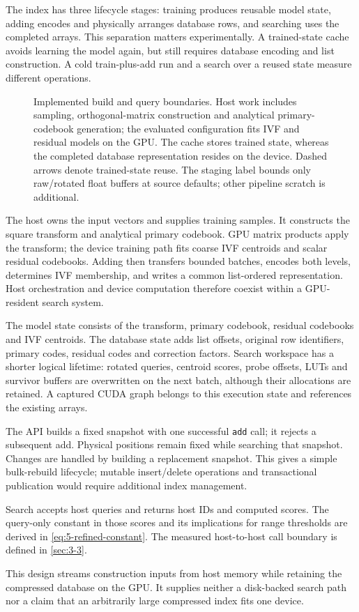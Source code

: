 The index has three lifecycle stages: training produces reusable model
state, adding encodes and physically arranges database rows, and searching
uses the completed arrays. This separation matters experimentally. A
trained-state cache avoids learning the model again, but still requires
database encoding and list construction. A cold train-plus-add run and a
search over a reused state measure different operations.

\begin{figure}[tbp]
\centering

\caption[Build and query architecture]{Implemented build and query boundaries. Host work includes
sampling, orthogonal-matrix construction and analytical primary-codebook
generation; the evaluated configuration fits IVF and residual models on
the GPU. The cache stores trained state, whereas the completed database
representation resides on the device. Dashed arrows denote trained-state
reuse. The staging label bounds only raw/rotated float buffers at source
defaults; other pipeline scratch is additional.}
\label{fig:4-architecture}
\end{figure}

The host owns the input vectors and supplies training samples. It constructs
the square transform and analytical primary codebook. GPU matrix products
apply the transform; the device training path fits coarse IVF centroids
and scalar residual codebooks. Adding then transfers bounded batches,
encodes both levels, determines IVF membership, and writes a common
list-ordered representation. Host orchestration and device computation
therefore coexist within a GPU-resident search system.

The model state consists of the transform, primary codebook, residual
codebooks and IVF centroids. The database state adds list offsets, original
row identifiers, primary codes, residual codes and correction factors.
Search workspace has a shorter logical lifetime: rotated queries, centroid
scores, probe offsets, LUTs and survivor buffers are overwritten on the
next batch, although their allocations are retained. A captured CUDA graph
belongs to this execution state and references the existing arrays.

The API builds a fixed snapshot with one successful \texttt{add}
call; it rejects a subsequent add. Physical positions remain fixed while
searching that snapshot. Changes are handled by building a replacement snapshot. This gives a
simple bulk-rebuild lifecycle; mutable insert/delete operations and
transactional publication would require additional index management.

Search accepts host queries and returns host IDs and computed scores.
The query-only constant in those scores and its implications for range
thresholds are derived in \cref{eq:5-refined-constant}. The measured
host-to-host call boundary is defined in \cref{sec:3-3}.


This design streams construction inputs from host memory while retaining
the compressed database on the GPU. It supplies neither a disk-backed
search path nor a claim that an arbitrarily large compressed index fits
one device.
